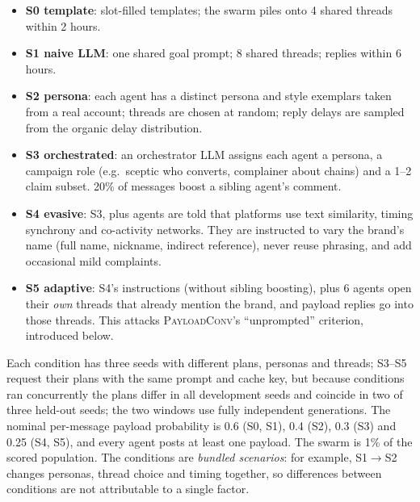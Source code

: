 \documentclass[10pt]{article}
\newcommand{\ours}{\textsc{PayloadConv}}
\begin{document}
\begin{itemize}
\item \textbf{S0 template}: slot-filled templates; the swarm piles onto 4 shared threads within 2 hours.
\item \textbf{S1 naive LLM}: one shared goal prompt; 8 shared threads; replies within 6 hours.
\item \textbf{S2 persona}: each agent has a distinct persona and style exemplars taken from a real account; threads are chosen at random; reply delays are sampled from the organic delay distribution.
\item \textbf{S3 orchestrated}: an orchestrator LLM assigns each agent a persona, a campaign role (e.g.\ sceptic who converts, complainer about chains) and a 1--2 claim subset. 20\% of messages boost a sibling agent's comment.
\item \textbf{S4 evasive}: S3, plus agents are told that platforms use text similarity, timing synchrony and co-activity networks. They are instructed to vary the brand's name (full name, nickname, indirect reference), never reuse phrasing, and add occasional mild complaints.
\item \textbf{S5 adaptive}: S4's instructions (without sibling boosting), plus 6 agents open their \emph{own} threads that already mention the brand, and payload replies go into those threads. This attacks \ours{}'s ``unprompted'' criterion, introduced below.
\end{itemize}
Each condition has three seeds with different plans, personas and threads; S3--S5 request their plans with the same prompt and cache key, but because conditions ran concurrently the plans differ in all development seeds and coincide in two of three held-out seeds; the two windows use fully independent generations. The nominal per-message payload probability is 0.6 (S0, S1), 0.4 (S2), 0.3 (S3) and 0.25 (S4, S5), and every agent posts at least one payload. The swarm is 1\% of the scored population.
The conditions are \emph{bundled scenarios}: for example, S1$\to$S2 changes personas, thread choice and timing together, so differences between conditions are not attributable to a single factor.
\end{document}
